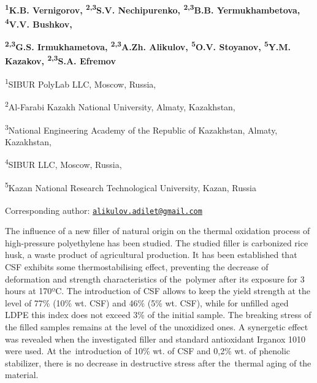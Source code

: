 
\begin{articleheader}

{\bfseries \textsuperscript{1}K.B. Vernigorov, \textsuperscript{2,3}S.V.
Nechipurenko, \textsuperscript{2,3}B.B. Yermukhambetova,
\textsuperscript{4}V.V. Bushkov,}

{\bfseries \textsuperscript{2,3}G.S. Irmukhametova,
\textsuperscript{2,3}A.Zh. Alikulov\textsuperscript{\envelope },
\textsuperscript{5}O.V. Stoyanov, \textsuperscript{5}Y.M. Kazakov,
\textsuperscript{2,3}S.A. Efremov}
\end{articleheader}

\begin{affiliation}
\textsuperscript{1}SIBUR PolyLab LLC, Moscow, Russia,

\textsuperscript{2}Al-Farabi Kazakh National University, Almaty,
Kazakhstan,

\textsuperscript{3}National Engineering Academy of the Republic of
Kazakhstan, Almaty, Kazakhstan,

\textsuperscript{4}SIBUR LLC, Moscow, Russia,

\textsuperscript{5}Kazan National Research Technological University,
Kazan, Russia

\raggedright \textsuperscript{\envelope }Corresponding author: \href{mailto:alikulov.adilet@gmail.com}{\nolinkurl{alikulov.adilet@gmail.com}}
\end{affiliation}

The influence of a new filler of natural origin on the thermal oxidation
process of high-pressure polyethylene has been studied. The studied
filler is carbonized rice husk, a waste product of agricultural
production. It has been established that CSF exhibits some
thermostabilising effect, preventing the decrease of deformation and
strength characteristics of the~polymer after its exposure for 3 hours
at 170ºC. The introduction of CSF allows to keep the yield strength at
the level of 77\% (10\% wt. CSF) and 46\% (5\% wt. CSF), while for
unfilled aged LDPE this index does not exceed 3\% of the initial sample.
The breaking stress of the filled samples remains at the level of the
unoxidized ones. A synergetic effect was revealed when the investigated
filler and standard antioxidant Irganox 1010 were used. At
the~introduction of 10\% wt. of CSF and 0,2\% wt. of phenolic
stabilizer, there is no decrease in destructive stress after the~thermal
aging of the material.

